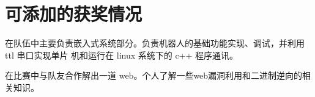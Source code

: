
\section{\faHeartO 可添加的获奖情况}
\begin{onehalfspacing}
在队伍中主要负责嵌入式系统部分。负责机器人的基础功能实现、调试，并利用 ttl 串口实现单片
机和运行在 linux 系统下的 c++ 程序通讯。
\end{onehalfspacing}
\begin{onehalfspacing}
    在比赛中与队友合作解出一道 web。个人了解一些web漏洞利用和二进制逆向的相关知识。
\end{onehalfspacing}

